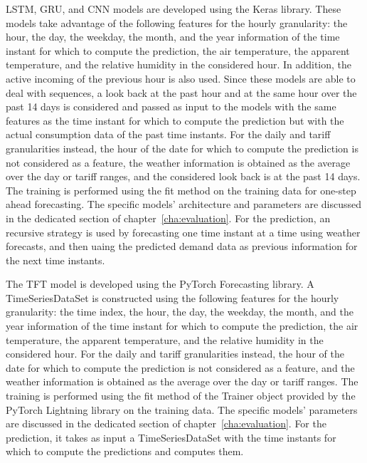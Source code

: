 LSTM, GRU, and CNN models are developed using the Keras library.
These models take advantage of the following features for the hourly granularity: the hour, the day, the weekday, the month, and the year information of the time instant for which to compute the prediction, the air temperature, the apparent temperature, and the relative humidity in the considered hour.
In addition, the active incoming of the previous hour is also used.
Since these models are able to deal with sequences, a look back at the past hour and at the same hour over the past 14 days is considered and passed as input to the models with the same features as the time instant for which to compute the prediction but with the actual consumption data of the past time instants.
For the daily and tariff granularities instead, the hour of the date for which to compute the prediction is not considered as a feature, the weather information is obtained as the average over the day or tariff ranges, and the considered look back is at the past 14 days.
The training is performed using the fit method on the training data for one-step ahead forecasting.
The specific models’ architecture and parameters are discussed in the dedicated section of chapter~\ref{cha:evaluation}.
For the prediction, an recursive strategy is used by forecasting one time instant at a time using weather forecasts, and then uaing the predicted demand data as previous information for the next time instants.

The TFT model is developed using the PyTorch Forecasting library.
A TimeSeriesDataSet is constructed using the following features for the hourly granularity: the time index, the hour, the day, the weekday, the month, and the year information of the time instant for which to compute the prediction, the air temperature, the apparent temperature, and the relative humidity in the considered hour.
For the daily and tariff granularities instead, the hour of the date for which to compute the prediction is not considered as a feature, and the weather information is obtained as the average over the day or tariff ranges.
The training is performed using the fit method of the Trainer object provided by the PyTorch Lightning library on the training data.
The specific models’ parameters are discussed in the dedicated section of chapter~\ref{cha:evaluation}.
For the prediction, it takes as input a TimeSeriesDataSet with the time instants for which to compute the predictions and computes them.

